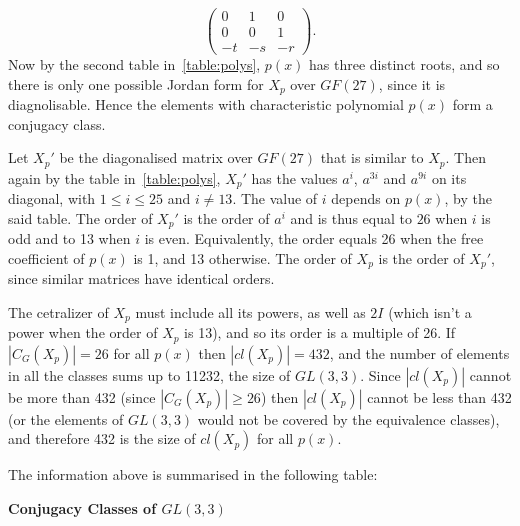 \documentclass[11pt]{article} \usepackage{amssymb}
\begin{document}
\begin{enumerate}
\begin{enumerate}
\begin{itemize}
\begin{equation*}
\begin{pmatrix}
            0&1  &0 \\ 
            0&0  &1 \\ 
            -t&-s  &-r 
          \end{pmatrix}.
        \end{equation*}
        Now by the second table in~\ref{table:polys}, $p(x)$ has three 
        distinct roots, and so there is only one possible Jordan form for $X_p$
        over $GF(27)$, since it is diagnolisable.
        Hence the elements with characteristic polynomial $p(x)$
        form a conjugacy class.
        
        Let $X_p'$ be the diagonalised matrix over $GF(27)$ that is similar
        to $X_p$. Then again by the table in~\ref{table:polys}, $X_p'$ has
        the values $a^i$, $a^{3i}$ and $a^{9i}$ on its diagonal, with $1 \leq i \leq 25$ and
        $i \neq 13$. The value of $i$ depends on $p(x)$, by the said table.
        The order of $X_p'$ is the order of $a^i$
        and is thus equal to $26$ when $i$ is odd and to 13 when $i$ is even.
        Equivalently, the order equals
        26 when the free coefficient of $p(x)$ is 1, and 13 otherwise.
        The order of $X_p$ is the order of $X_p'$, 
        since similar matrices have identical orders.

        The cetralizer of $X_p$ must include all its powers, as well as
        $2I$ (which isn't a power when the order of $X_p$ is 13), and so its 
        order is a multiple of 26. If $|C_G(X_p)|=26$ for all $p(x)$ then
        $|cl(X_p)|=432$, and the number of elements in all the classes sums
        up to 11232, the size of $GL(3,3)$. Since $|cl(X_p)|$ cannot be more
        than 432 (since $|C_G(X_p)| \geq 26$) then $|cl(X_p)|$ cannot be less
        than 432 (or the elements of $GL(3,3)$ would not be covered by the
        equivalence classes), and therefore 432 is the size of $cl(X_p)$
        for all $p(x)$. 
      \end{itemize}
      The information above is summarised in the following table:

      {\bf Conjugacy Classes of $GL(3,3)$}


\end{enumerate}
\end{enumerate}
\end{document}
